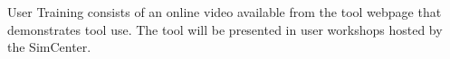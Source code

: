 User Training consists of an online video available from the tool webpage that demonstrates tool use. The tool will be presented in user workshops hosted by the SimCenter. 